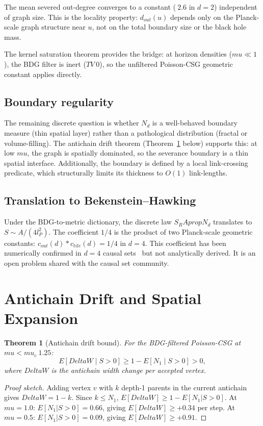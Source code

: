 \documentclass[11pt]{article}
\def\Delta{Delta}%
\def\mu{mu}%
\def\mathrm#1{#1}%
\def\mathbb#1{#1}%
\def\cdot{*}%
\def\approx{~}%
\def\partial{d}%
\def\propto{prop}%
\def\SRa{S_RA}%
\def\TV{TV}%
\newtheorem{theorem}{Theorem}
\newcommand{\SRa}{S_{\mathrm{RA}}}
\newcommand{\TV}{\mathrm{TV}}
\begin{document}
The mean severed out-degree converges to a constant ($\approx 2.6$ in $d=2$) independent of graph size. This is the locality property: $d_{\mathrm{out}}(u)$ depends only on the Planck-scale graph structure near $u$, not on the total boundary size or the black hole mass.

The kernel saturation theorem provides the bridge: at horizon densities ($\mu\ll 1$), the BDG filter is inert ($\TV\approx 0$), so the unfiltered Poisson-CSG geometric constant applies directly.

\subsection{Boundary regularity}

The remaining discrete question is whether $N_\partial$ is a well-behaved boundary measure (thin spatial layer) rather than a pathological distribution (fractal or volume-filling). The antichain drift theorem (Theorem~\ref{thm:drift} below) supports this: at low $\mu$, the graph is spatially dominated, so the severance boundary is a thin spatial interface. Additionally, the boundary is defined by a local link-crossing predicate, which structurally limits its thickness to $O(1)$ link-lengths.

\subsection{Translation to Bekenstein--Hawking}

Under the BDG-to-metric dictionary, the discrete law $\SRa\propto N_\partial$ translates to $S\sim A/(4l_P^2)$. The coefficient $1/4$ is the product of two Planck-scale geometric constants: $c_{\mathrm{out}}(d)\cdot c_{\mathrm{tile}}(d)=1/4$ in $d=4$. This coefficient has been numerically confirmed in $d=4$ causal sets~\cite{Homsak2024} but not analytically derived. It is an open problem shared with the causal set community.

\section{Antichain Drift and Spatial Expansion}
\label{sec:drift}

\begin{theorem}[Antichain drift bound]
\label{thm:drift}
For the BDG-filtered Poisson-CSG at $\mu<\mu_c\approx 1.25$:
\begin{equation}
\mathbb{E}[\Delta W\mid S>0]\ge 1-\mathbb{E}[N_1\mid S>0]>0,
\end{equation}
where $\Delta W$ is the antichain width change per accepted vertex.
\end{theorem}
\begin{proof}[Proof sketch]
Adding vertex $v$ with $k$ depth-1 parents in the current antichain gives $\Delta W=1-k$. Since $k\le N_1$, $\mathbb{E}[\Delta W]\ge 1-\mathbb{E}[N_1|S>0]$. At $\mu=1.0$: $\mathbb{E}[N_1|S>0]=0.66$, giving $\mathbb{E}[\Delta W]\ge +0.34$ per step. At $\mu=0.5$: $\mathbb{E}[N_1|S>0]=0.09$, giving $\mathbb{E}[\Delta W]\ge +0.91$.
\end{proof}
\end{document}
